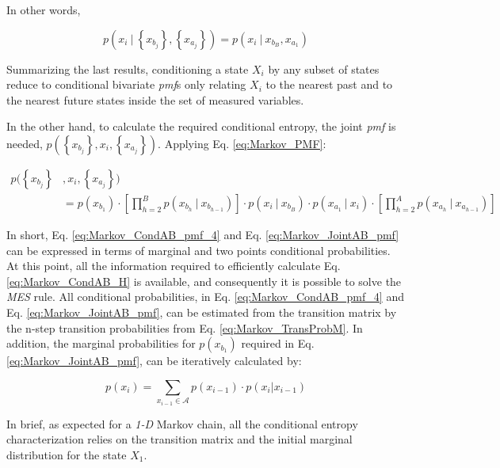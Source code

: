 In other words,

\begin{equation}
\label{eq:Markov_CondAB_pmf_5}
p(x_{i} \ | \ \left\{x_{b_{j}}\right\} , \left\{x_{a_{j}}\right\}) = p(x_{i} \ | \ x_{b_{B}} , x_{a_{1}})
\end{equation}


Summarizing the last results, conditioning a state $X_{i}$ by any subset of states reduce to conditional bivariate \emph{pmf}s only relating $X_{i}$ to the nearest past and to the nearest future states inside the set of measured variables.

In the other hand, to calculate the required conditional entropy, the joint \emph{pmf} is needed, $p(\left\{x_{b_{j}}\right\} , x_{i}, \left\{x_{a_{j}}\right\})$. Applying Eq. \eqref{eq:Markov_PMF}:

\begin{align}
\label{eq:Markov_JointAB_pmf}
p(\left\{x_{b_{j}}\right\} & , x_{i}, \left\{x_{a_{j}}\right\})   \nonumber \\
& = p(x_{b_{1}}) \cdot \left[ \prod_{h = 2}^{B}{p(x_{b_{h}} \ | \ x_{b_{h-1}})} \right] \cdot p(x_{i} \ | \ x_{b_{B}}) \cdot p(x_{a_{1}} \ | \ x_{i}) \cdot \left[ \prod_{h = 2}^{A}{p(x_{a_{h}} \ | \ x_{a_{h-1}})}  \right]
\end{align}

In short, Eq. \eqref{eq:Markov_CondAB_pmf_4} and Eq. \eqref{eq:Markov_JointAB_pmf} can be expressed in terms of marginal and two points conditional probabilities. At this point, all the information required to efficiently calculate Eq. \eqref{eq:Markov_CondAB_H} is available, and consequently it is possible to solve the \emph{MES} rule. All conditional probabilities, in Eq. \eqref{eq:Markov_CondAB_pmf_4} and Eq. \eqref{eq:Markov_JointAB_pmf}, can be estimated from the transition matrix by the n-step transition probabilities from Eq. \eqref{eq:Markov_TransProbM}. In addition, the marginal probabilities for $p(x_{b_{1}})$ required in Eq. \eqref{eq:Markov_JointAB_pmf}, can be iteratively calculated \citep{cover_2006} by:

\begin{equation}
\label{eq:Markov_Marginal_pmf}
	p(x_{i}) = \sum_{x_{i-1} \in \mathcal{A}}{ p(x_{i-1}) \cdot p(x_{i} | x_{i-1})}
\end{equation}

In brief, as expected for a \emph{1-D} Markov chain, all the conditional entropy characterization relies on the transition matrix and the initial marginal distribution for the state $X_{1}$.

